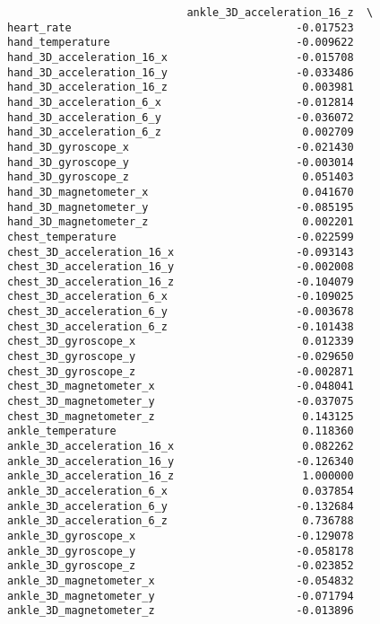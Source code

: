 \documentclass[11pt]{article}
\begin{document}
\begin{verbatim}
                            ankle_3D_acceleration_16_z  \
heart_rate                                   -0.017523   
hand_temperature                             -0.009622   
hand_3D_acceleration_16_x                    -0.015708   
hand_3D_acceleration_16_y                    -0.033486   
hand_3D_acceleration_16_z                     0.003981   
hand_3D_acceleration_6_x                     -0.012814   
hand_3D_acceleration_6_y                     -0.036072   
hand_3D_acceleration_6_z                      0.002709   
hand_3D_gyroscope_x                          -0.021430   
hand_3D_gyroscope_y                          -0.003014   
hand_3D_gyroscope_z                           0.051403   
hand_3D_magnetometer_x                        0.041670   
hand_3D_magnetometer_y                       -0.085195   
hand_3D_magnetometer_z                        0.002201   
chest_temperature                            -0.022599   
chest_3D_acceleration_16_x                   -0.093143   
chest_3D_acceleration_16_y                   -0.002008   
chest_3D_acceleration_16_z                   -0.104079   
chest_3D_acceleration_6_x                    -0.109025   
chest_3D_acceleration_6_y                    -0.003678   
chest_3D_acceleration_6_z                    -0.101438   
chest_3D_gyroscope_x                          0.012339   
chest_3D_gyroscope_y                         -0.029650   
chest_3D_gyroscope_z                         -0.002871   
chest_3D_magnetometer_x                      -0.048041   
chest_3D_magnetometer_y                      -0.037075   
chest_3D_magnetometer_z                       0.143125   
ankle_temperature                             0.118360   
ankle_3D_acceleration_16_x                    0.082262   
ankle_3D_acceleration_16_y                   -0.126340   
ankle_3D_acceleration_16_z                    1.000000   
ankle_3D_acceleration_6_x                     0.037854   
ankle_3D_acceleration_6_y                    -0.132684   
ankle_3D_acceleration_6_z                     0.736788   
ankle_3D_gyroscope_x                         -0.129078   
ankle_3D_gyroscope_y                         -0.058178   
ankle_3D_gyroscope_z                         -0.023852   
ankle_3D_magnetometer_x                      -0.054832   
ankle_3D_magnetometer_y                      -0.071794   
ankle_3D_magnetometer_z                      -0.013896   


\end{verbatim}
\end{document}
